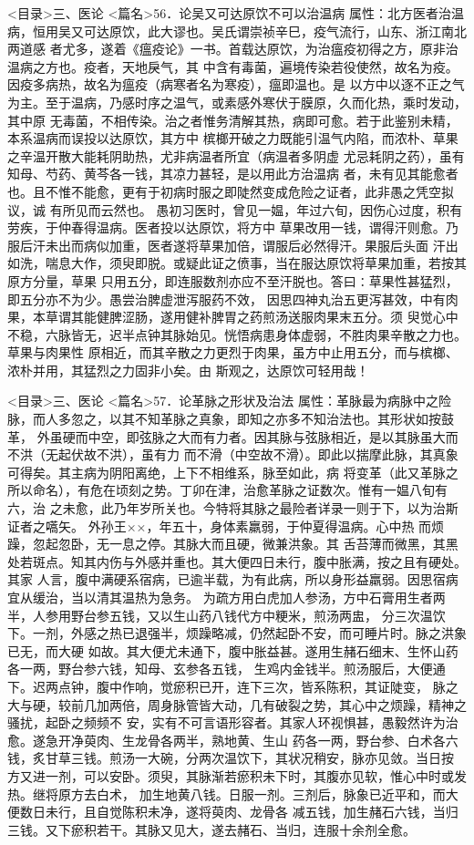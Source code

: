 \documentclass[a4paper,12pt,UTF8,twoside]{ctexbook}
\begin{document}
<目录>三、医论
<篇名>56．论吴又可达原饮不可以治温病
属性：北方医者治温病，恒用吴又可达原饮，此大谬也。吴氏谓崇祯辛巳，疫气流行，山东、浙江南北两道感 
者尤多，遂着《瘟疫论》一书。首载达原饮，为治瘟疫初得之方，原非治温病之方也。疫者，天地戾气，其 
中含有毒菌，遍境传染若役使然，故名为疫。因疫多病热，故名为瘟疫（病寒者名为寒疫），瘟即温也。是 
以方中以逐不正之气为主。至于温病，乃感时序之温气，或素感外寒伏于膜原，久而化热，乘时发动，其中原 
无毒菌，不相传染。治之者惟务清解其热，病即可愈。若于此鉴别未精，本系温病而误投以达原饮，其方中 
槟榔开破之力既能引温气内陷，而浓朴、草果之辛温开散大能耗阴助热，尤非病温者所宜（病温者多阴虚 
尤忌耗阴之药），虽有知母、芍药、黄芩各一钱，其凉力甚轻，是以用此方治温病 
者，未有见其能愈者也。且不惟不能愈，更有于初病时服之即陡然变成危险之证者，此非愚之凭空拟议，诚 
有所见而云然也。 
愚初习医时，曾见一媪，年过六旬，因伤心过度，积有劳疾，于仲春得温病。医者投以达原饮，将方中 
草果改用一钱，谓得汗则愈。乃服后汗未出而病似加重，医者遂将草果加倍，谓服后必然得汗。果服后头面 
汗出如洗，喘息大作，须臾即脱。或疑此证之偾事，当在服达原饮将草果加重，若按其原方分量，草果 
只用五分，即连服数剂亦应不至汗脱也。答曰∶草果性甚猛烈，即五分亦不为少。愚尝治脾虚泄泻服药不效， 
因思四神丸治五更泻甚效，中有肉果，本草谓其能健脾涩肠，遂用健补脾胃之药煎汤送服肉果末五分。须 
臾觉心中不稳，六脉皆无，迟半点钟其脉始见。恍悟病患身体虚弱，不胜肉果辛散之力也。草果与肉果性 
原相近，而其辛散之力更烈于肉果，虽方中止用五分，而与槟榔、浓朴并用，其猛烈之力固非小矣。由 
斯观之，达原饮可轻用哉！ 

<目录>三、医论
<篇名>57．论革脉之形状及治法
属性：革脉最为病脉中之险脉，而人多忽之，以其不知革脉之真象，即知之亦多不知治法也。其形状如按鼓革， 
外虽硬而中空，即弦脉之大而有力者。因其脉与弦脉相近，是以其脉虽大而不洪（无起伏故不洪），虽有力 
而不滑（中空故不滑）。即此以揣摩此脉，其真象可得矣。其主病为阴阳离绝，上下不相维系，脉至如此，病 
将变革（此又革脉之所以命名），有危在顷刻之势。丁卯在津，治愈革脉之证数次。惟有一媪八旬有六，治 
之未愈，此乃年岁所关也。今特将其脉之最险者详录一则于下，以为治斯证者之嚆矢。 
外孙王××，年五十，身体素羸弱，于仲夏得温病。心中热 
而烦躁，忽起忽卧，无一息之停。其脉大而且硬，微兼洪象。其 
舌苔薄而微黑，其黑处若斑点。知其内伤与外感并重也。其大便四日未行，腹中胀满，按之且有硬处。其家 
人言，腹中满硬系宿病，已逾半载，为有此病，所以身形益羸弱。因思宿病宜从缓治，当以清其温热为急务。 
为疏方用白虎加人参汤，方中石膏用生者两半，人参用野台参五钱，又以生山药八钱代方中粳米，煎汤两盅， 
分三次温饮下。一剂，外感之热已退强半，烦躁略减，仍然起卧不安，而可睡片时。脉之洪象已无，而大硬 
如故。其大便尤未通下，腹中胀益甚。遂用生赭石细末、生怀山药各一两，野台参六钱，知母、玄参各五钱， 
生鸡内金钱半。煎汤服后，大便通下。迟两点钟，腹中作响，觉瘀积已开，连下三次，皆系陈积，其证陡变， 
脉之大与硬，较前几加两倍，周身脉管皆大动，几有破裂之势，其心中之烦躁，精神之骚扰，起卧之频频不 
安，实有不可言语形容者。其家人环视惧甚，愚毅然许为治愈。遂急开净萸肉、生龙骨各两半，熟地黄、生山 
药各一两，野台参、白术各六钱，炙甘草三钱。煎汤一大碗，分两次温饮下，其状况稍安，脉亦见敛。当日按 
方又进一剂，可以安卧。须臾，其脉渐若瘀积未下时，其腹亦见软，惟心中时或发热。继将原方去白术， 
加生地黄八钱。日服一剂。三剂后，脉象已近平和，而大便数日未行，且自觉陈积未净，遂将萸肉、龙骨各 
减五钱，加生赭石六钱，当归三钱。又下瘀积若干。其脉又见大，遂去赭石、当归，连服十余剂全愈。 
\end{document}
